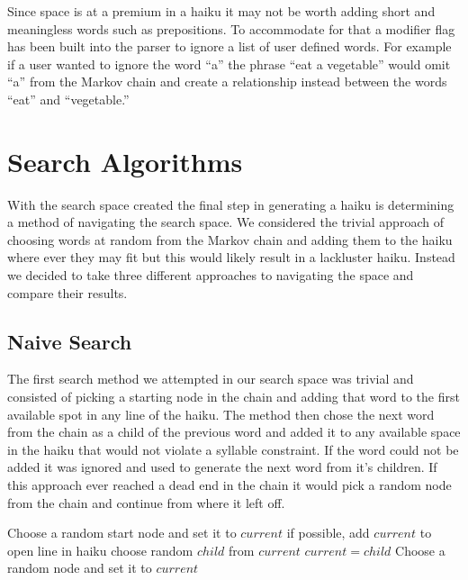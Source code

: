 \documentclass[]{article}
\begin{document}
Since space is at a premium in a haiku it may not be worth adding short and meaningless words such as prepositions. To accommodate for that a modifier flag has been built into the parser to ignore a list of user defined words. For example if a user wanted to ignore the word ``a'' the phrase ``eat a vegetable'' would omit ``a'' from the Markov chain and create a relationship instead between the words ``eat'' and ``vegetable.''

\section{Search Algorithms}
With the search space created the final step in generating a haiku is determining a method of navigating the search space. We considered the trivial approach of choosing words at random from the Markov chain and adding them to the haiku where ever they may fit but this would likely result in a lackluster haiku. Instead we decided to take three different approaches to navigating the space and compare their results.

\subsection{Naive Search}
The first search method we attempted in our search space was trivial and consisted of picking a starting node in the chain and adding that word to the first available spot in any line of the haiku. The method then chose the next word from the chain as a child of the previous word and added it to any available space in the haiku that would not violate a syllable constraint. If the word could not be added it was ignored and used to generate the next word from it's children. If this approach ever reached a dead end in the chain it would pick a random node from the chain and continue from where it left off.

\begin{algorithm}[H]
	\caption{$Naive\_Search()$} \label{Naive}
	\begin{algorithmic}[1]
		\State Choose a random start node and set it to $current$
			\State if possible, add $current$ to open line in haiku
				\State choose random $child$ from $current$
				\State $current = child$
			\Else
				\State Choose a random node and set it to $current$
			\EndIf
		\EndWhile
	\end{algorithmic}
\end{algorithm}
\end{document}
